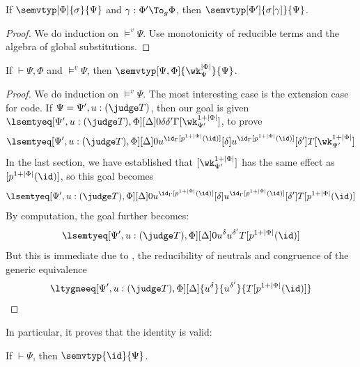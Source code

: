 \begin{lemma}[Monotonicity]
  If $\semvtyp[\Phi]{\sigma}{\Psi}$ and $\gamma : \Phi' \To_g \Phi$, then
  $\semvtyp[\Phi']{\sigma[\gamma]}{\Psi}$.
\end{lemma}
\begin{proof}
  We do induction on $\vDash^v \Psi$. %
  Use monotonicity of reducible terms and the algebra of global substitutions. %
\end{proof}

\begin{lemma}
  If $\vdash \Psi, \Phi$ and $\vDash^v \Psi$, then $\semvtyp[\Psi,\Phi]{\wk^{|\Phi|}_{\Psi}}{\Psi}$. 
\end{lemma}
\begin{proof}
  We do induction on $\vDash^v \Psi$. %
  The most interesting case is the extension case for code. %
  If $\Psi = \Psi', u : (\judge T)$, then our goal is given $\lsemtyeq[\Psi', u : (\judge T), \Phi][\Delta]0{\delta}{\delta'}{\Gamma[\wk^{1 + |\Phi|}_{\Psi'}]}$, to prove
  \[
    \lsemtyeq[\Psi', u : (\judge T), \Phi][\Delta] 0 {u^{\id_{\Gamma}[p^{1 + |\Phi|}(\id)]}[\delta]}{u^{\id_{\Gamma}[p^{1 + |\Phi|}(\id)]}[\delta']}{T[\wk^{1 + |\Phi|}_{\Psi'}]}
  \]
  In the last section, we have established that $[\wk^{1 + |\Phi|}_{\Psi'}]$ has the
  same effect as $[p^{1 + |\Phi|}(\id)]$, so this goal becomes
  \[
    \lsemtyeq[\Psi', u : (\judge T), \Phi][\Delta] 0 {u^{\id_{\Gamma}[p^{1 + |\Phi|}(\id)]}[\delta]}{u^{\id_{\Gamma}[p^{1 + |\Phi|}(\id)]}[\delta']}{T[p^{1 + |\Phi|}(\id)]}
  \]
  By computation, the goal further becomes:
  \[
    \lsemtyeq[\Psi', u : (\judge T), \Phi][\Delta] 0 {u^{\delta}}{u^{\delta'}}{T[p^{1 + |\Phi|}(\id)]}
  \]
  But this is immediate due to , the reducibility of
  neutrals and congruence of the generic equivalence
  \[
    \ltygneeq[\Psi', u : (\judge T), \Phi][\Delta] {u^{\delta}}{u^{\delta'}}{T[p^{1 + |\Phi|}(\id)]}
  \]
\end{proof}

In particular, it proves that the identity is valid:
\begin{corollary}
  If $\vdash \Psi$, then $\semvtyp{\id}{\Psi}$. 
\end{corollary}


